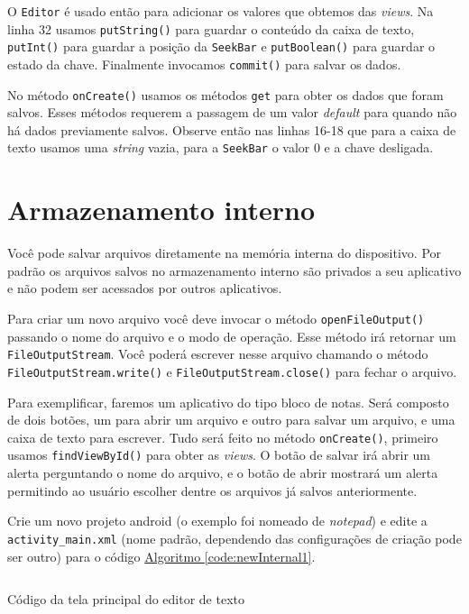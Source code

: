 \documentclass[a4paper,12pt,brazil,oneside]{book}
\begin{document}
		O \texttt{Editor} é usado então para adicionar os valores que obtemos das \emph{views}. Na linha 32 usamos \texttt{putString()} para guardar o conteúdo da caixa de texto,
\texttt{putInt()} para guardar a posição da \texttt{SeekBar} e \texttt{putBoolean()} para guardar o estado da chave. Finalmente invocamos \texttt{commit()} para salvar os dados.

		No método \texttt{onCreate()} usamos os métodos \texttt{get} para obter os dados que foram salvos. Esses métodos requerem a passagem de um valor \emph{default} para quando não há dados previamente salvos. Observe então nas linhas 16-18 que para a caixa de texto usamos uma \emph{string} vazia, para a \texttt{SeekBar} o valor 0 e a chave desligada.


		\section{Armazenamento interno}

		Você pode salvar arquivos diretamente na memória interna do dispositivo. Por padrão os arquivos salvos no armazenamento interno são privados a seu aplicativo e não podem ser acessados por outros aplicativos. 

		Para criar um novo arquivo você deve invocar o método \texttt{openFileOutput()} passando o nome do arquivo e o modo de operação. Esse método irá retornar um \texttt{FileOutputStream}. Você poderá escrever nesse arquivo chamando o método \texttt{FileOutputStream.write()} e \texttt{FileOutputStream.close()} para fechar o arquivo.

		Para exemplificar, faremos um aplicativo do tipo bloco de notas. Será composto de dois botões, um para abrir um arquivo e outro para salvar um arquivo, e uma caixa de texto para escrever. Tudo será feito no método \texttt{onCreate()}, primeiro  usamos \texttt{findViewById()} para obter as \emph{views}. O botão de salvar irá abrir um alerta perguntando o nome do arquivo, e o botão de abrir mostrará um alerta permitindo ao usuário escolher dentre os arquivos já salvos anteriormente.

		Crie um novo projeto android (o exemplo foi nomeado de \emph{notepad}) e edite a \texttt{activity\_main.xml} (nome padrão, dependendo das configurações de criação pode ser outro) para o código \hyperref[code:newInternal1]{Algoritmo \ref*{code:newInternal1}}.
		
		\begin{listing}[H]
		\inputminted[linenos=true,fontsize=\small,frame=lines, framesep=2mm, tabsize=2,numbersep=5pt]{java}{src/api/storage/newInternal1.xml}
		\caption{Código da tela principal do editor de texto}
		\label{code:newInternal1}
		\end{listing} 	
		
\end{document}
